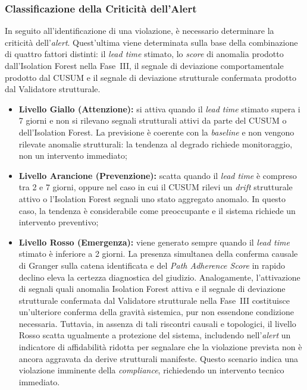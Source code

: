 \subsubsection{Classificazione della Criticità dell'Alert}
\label{sec:classificazione_criticita}

In seguito all'identificazione di una violazione, è necessario determinare la criticità
dell'\textit{alert}. Quest'ultima viene determinata sulla base della combinazione di quattro fattori
distinti: il \textit{lead time} stimato, lo \textit{score} di anomalia prodotto dall'Isolation
Forest nella Fase~III, il segnale di deviazione comportamentale prodotto dal \gls{CUSUM} e il
segnale di deviazione strutturale confermata prodotto dal Validatore strutturale.

\begin{itemize}
  \item \textbf{Livello Giallo (Attenzione):} si attiva quando il \textit{lead time} stimato
        supera i 7 giorni e non si rilevano segnali strutturali attivi da parte del \gls{CUSUM}
        o dell'Isolation Forest. La previsione è coerente con la \textit{baseline} e non vengono
        rilevate anomalie strutturali: la tendenza al degrado richiede monitoraggio, non un
        intervento immediato;
  \item \textbf{Livello Arancione (Prevenzione):} scatta quando il \textit{lead time} è compreso
        tra 2 e 7 giorni, oppure nel caso in cui il \gls{CUSUM} rilevi un \textit{drift}
        strutturale attivo o l'Isolation Forest segnali uno stato aggregato anomalo. In questo
        caso, la tendenza è considerabile come preoccupante e il sistema richiede un intervento
        preventivo;
  \item \textbf{Livello Rosso (Emergenza):} viene generato sempre quando il \textit{lead time}
        stimato è inferiore a 2 giorni. La presenza simultanea della conferma causale di Granger
        sulla catena identificata e del \textit{Path Adherence Score} in rapido declino eleva la
        certezza diagnostica del giudizio. Analogamente, l'attivazione di segnali quali anomalia
        Isolation Forest attiva e il segnale di deviazione strutturale confermata dal Validatore
        strutturale nella Fase~III costituisce un'ulteriore conferma della gravità sistemica, pur
        non essendone condizione necessaria. Tuttavia, in assenza di tali riscontri causali e
        topologici, il livello Rosso scatta ugualmente a protezione del sistema, includendo
        nell'\textit{alert} un indicatore di affidabilità ridotta per segnalare che la violazione
        prevista non è ancora aggravata da derive strutturali manifeste. Questo scenario indica una
        violazione imminente della \textit{compliance}, richiedendo un intervento tecnico immediato.
\end{itemize}

